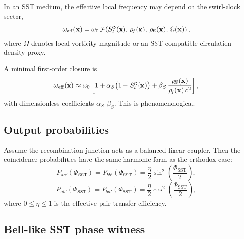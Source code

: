 \documentclass[11pt]{article}
\newcommand{\swirlarrow}{\mathchoice{\mkern-2mu\scriptstyle\boldsymbol{\circlearrowleft}}{\mkern-2mu\scriptstyle\boldsymbol{\circlearrowleft}}{\mkern-2mu\scriptscriptstyle\boldsymbol{\circlearrowleft}}{\mkern-2mu\scriptscriptstyle\boldsymbol{\circlearrowleft}}}
\newcommand{\SwirlClock}{S_t^{\swirlarrow}}
\newcommand{\rhoF}{\rho_{\!f}}
\newcommand{\rhoE}{\rho_{\!E}}
\begin{document}
            In an SST medium, the effective local frequency may depend on the swirl-clock sector,
            \begin{equation}
                \omega_{\mathrm{eff}}(\mathbf{x})
                =
                \omega_0\,\mathcal{F}\!\left(\SwirlClock(\mathbf{x}),\,\rhoF(\mathbf{x}),\,\rhoE(\mathbf{x}),\,\Omega(\mathbf{x})\right),
                \label{eq:omega_eff_general}
            \end{equation}
            where \(\Omega\) denotes local vorticity magnitude or an SST-compatible circulation-density proxy.
            
            A minimal first-order closure is
            \begin{equation}
                \omega_{\mathrm{eff}}(\mathbf{x})
                \approx
                \omega_0
                \left[
                    1+\alpha_S\bigl(1-\SwirlClock(\mathbf{x})\bigr)
                    +\beta_S\,\frac{\rhoE(\mathbf{x})}{\rhoF(\mathbf{x})\,c^2}
                \right],
                \label{eq:omega_eff_closure}
            \end{equation}
            with dimensionless coefficients \(\alpha_S,\beta_S\). This is phenomenological.
        
        \subsection{Output probabilities}
            
            Assume the recombination junction acts as a balanced linear coupler. Then the coincidence probabilities have the same harmonic form as the orthodox case:
            \begin{equation}
                P_{aa'}(\Phi_{\mathrm{SST}})=P_{bb'}(\Phi_{\mathrm{SST}})
                =\frac{\eta}{2}\sin^2\!\left(\frac{\Phi_{\mathrm{SST}}}{2}\right),
                \label{eq:Paa}
            \end{equation}
            \begin{equation}
                P_{ab'}(\Phi_{\mathrm{SST}})=P_{ba'}(\Phi_{\mathrm{SST}})
                =\frac{\eta}{2}\cos^2\!\left(\frac{\Phi_{\mathrm{SST}}}{2}\right),
                \label{eq:Pab}
            \end{equation}
            where \(0\le \eta \le 1\) is the effective pair-transfer efficiency.
        
        \subsection{Bell-like SST phase witness}
            
\end{document}
